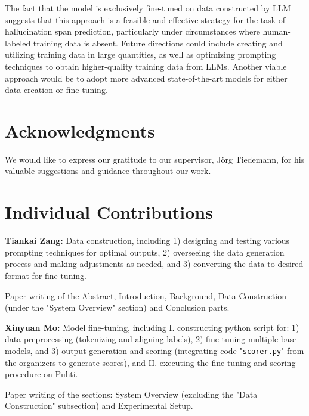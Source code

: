\documentclass[11pt]{article}
\begin{document}
The fact that the model is exclusively fine-tuned on data constructed by LLM suggests that this approach is a feasible and effective strategy for the task of hallucination span prediction, particularly under circumstances where human-labeled training data is absent. Future directions could include creating and utilizing training data in large quantities, as well as optimizing prompting techniques to obtain higher-quality training data from LLMs. Another viable approach would be to adopt more advanced state-of-the-art models for either data creation or fine-tuning.

\section{Acknowledgments}
We would like to express our gratitude to our supervisor, Jörg Tiedemann, for his valuable suggestions and guidance throughout our work.

\section{Individual Contributions}
\textbf{Tiankai Zang: } Data construction, including 1) designing and testing various prompting techniques for optimal outputs, 2) overseeing the data generation process and making adjustments as needed, and 3) converting the data to desired format for fine-tuning. 

Paper writing of the Abstract, Introduction, Background, Data Construction (under the "System Overview" section) and Conclusion parts.

\textbf{Xinyuan Mo: } Model fine-tuning, including I. constructing python script for: 1) data preprocessing (tokenizing and aligning labels), 2) fine-tuning multiple base models, and 3) output generation and scoring (integrating code "\texttt{scorer.py}" from the organizers to generate scores), and II. executing the fine-tuning and scoring procedure on Puhti. 

Paper writing of the sections: System Overview (excluding the "Data Construction" subsection) and Experimental Setup.



\newpage

\appendix
\end{document}
